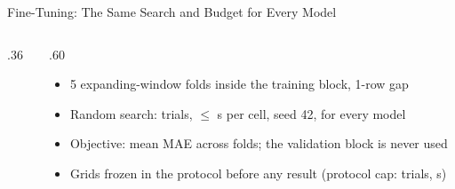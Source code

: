 \documentclass[aspectratio=169,11pt]{beamer}
\newcommand{\currentspeaker}{}
\newcommand{\speaker}[1]{\gdef\currentspeaker{#1}}
\begin{document}
\begin{frame}{Fine-Tuning: The Same Search and Budget for Every Model}
  \speaker{Zhang Yancheng}
  \begin{columns}[T,onlytextwidth]
    \begin{column}{.36\textwidth}
      \centering
    \end{column}
    \begin{column}{.60\textwidth}
      \scriptsize
      \begin{itemize}\setlength{\itemsep}{0pt}
        \item 5 expanding-window folds inside the training block, 1-row gap
        \item Random search: \TrialsUsed{} trials, $\le$\SecondsUsed{} s per cell, seed 42, for every model
        \item Objective: mean MAE across folds; the validation block is never used
        \item Grids frozen in the protocol before any result (protocol cap: \TrialsMax{} trials, \SecondsMax{} s)
      \end{itemize}
    \end{column}
  \end{columns}
  \par\vspace{2mm}
  \centering\tiny
  \setlength{\tabcolsep}{4pt}
  \renewcommand{\arraystretch}{1.1}
  
\end{frame}
\end{document}
